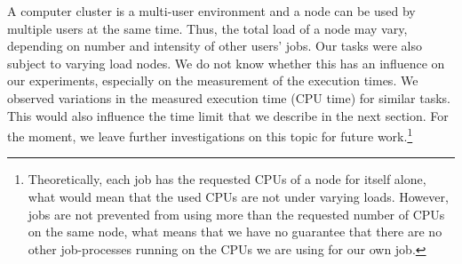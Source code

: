 A computer cluster is a multi-user environment and a node can be used by multiple users at the same time. Thus, the total load of a node may vary, depending on number and intensity of other users' jobs. Our tasks were also subject to varying load nodes. We do not know whether this has an influence on our experiments, especially on the measurement of the execution times. We observed variations in the measured execution time (CPU time) for similar tasks. This would also influence the time limit that we describe in the next section. For the moment, we leave further investigations on this topic for future work.\footnote{Theoretically, each job has the requested CPUs of a node for itself alone, what would mean that the used CPUs are not under varying loads. However, jobs are not prevented from using more than the requested number of CPUs on the same node, what means that we have no guarantee that there are no other job-processes running on the CPUs we are using for our own job.}

